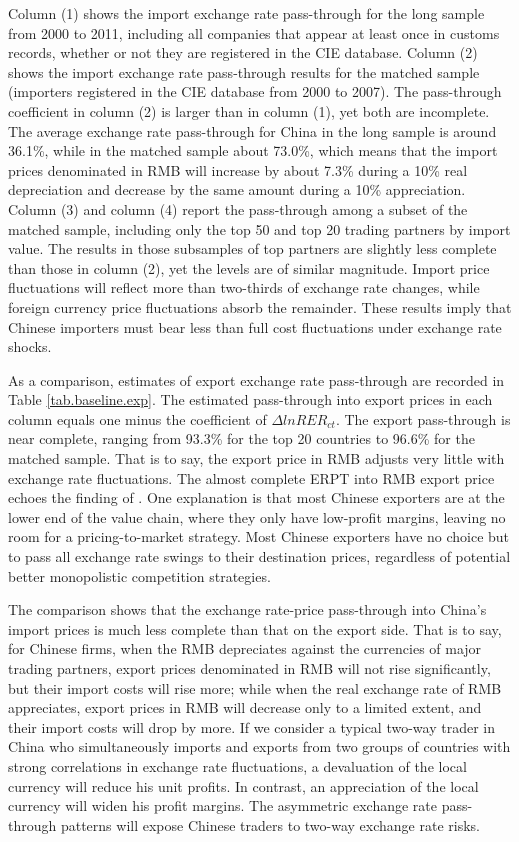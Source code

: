 \documentclass[12pt]{article}
\begin{document}
Column (1) shows the import exchange rate pass-through for the long sample from 2000 to 2011, including all companies that appear at least once in customs records, whether or not they are registered in the CIE database. Column (2) shows the import exchange rate pass-through results for the matched sample (importers registered in the CIE database from 2000 to 2007). The pass-through coefficient in column (2) is larger than in column (1), yet both are incomplete. The average exchange rate pass-through for China in the long sample is around 36.1\%, while in the matched sample about 73.0\%, which means that the import prices denominated in RMB will increase by about 7.3\% during a 10\% real depreciation and decrease by the same amount during a 10\% appreciation. Column (3) and column (4) report the pass-through among a subset of the matched sample, including only the top 50 and top 20 trading partners by import value. The results in those subsamples of top partners are slightly less complete than those in column (2), yet the levels are of similar magnitude. Import price fluctuations will reflect more than two-thirds of exchange rate changes, while foreign currency price fluctuations absorb the remainder. These results imply that Chinese importers must bear less than full cost fluctuations under exchange rate shocks. 

As a comparison, estimates of export exchange rate pass-through are recorded in Table \ref{tab.baseline.exp}. The estimated pass-through into export prices in each column equals one minus the coefficient of $\Delta lnRER_{ct}$. The export pass-through is near complete, ranging from 93.3\% for the top 20 countries to 96.6\% for the matched sample. That is to say, the export price in RMB adjusts very little with exchange rate fluctuations. The almost complete ERPT into RMB export price echoes the finding of \cite{lmx2015}. One explanation is that most Chinese exporters are at the lower end of the value chain, where they only have low-profit margins, leaving no room for a pricing-to-market strategy. Most Chinese exporters have no choice but to pass all exchange rate swings to their destination prices, regardless of potential better monopolistic competition strategies.

The comparison shows that the exchange rate-price pass-through into China's import prices is much less complete than that on the export side. That is to say, for Chinese firms, when the RMB depreciates against the currencies of major trading partners, export prices denominated in RMB will not rise significantly, but their import costs will rise more; while when the real exchange rate of RMB appreciates, export prices in RMB will decrease only to a limited extent, and their import costs will drop by more. If we consider a typical two-way trader in China who simultaneously imports and exports from two groups of countries with strong correlations in exchange rate fluctuations, a devaluation of the local currency will reduce his unit profits. In contrast, an appreciation of the local currency will widen his profit margins. The asymmetric exchange rate pass-through patterns will expose Chinese traders to two-way exchange rate risks.
\end{document}
